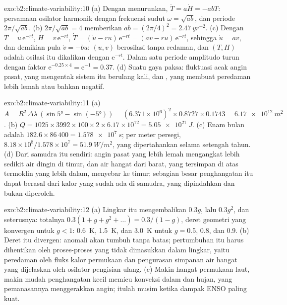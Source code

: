 \begin{solution}{exo:b2:climate-variability:10}
(a) Dengan menurunkan, $\ddot T = a\dot H = -abT$: persamaan osilator harmonik dengan frekuensi
sudut $\omega = \sqrt{ab}$, dan periode $2\pi/\sqrt{ab}$. (b) $2\pi/\sqrt{ab} = 4$ memberikan $ab =
(2\pi/4)^2 = \qty{2.47}{yr^{-2}}$. (c) Dengan $T = u\,\mathrm{e}^{-rt}$, $H = v\,\mathrm{e}^{-rt}$,
$\dot T = (\dot u - ru)\,\mathrm{e}^{-rt} = (av - ru)\,\mathrm{e}^{-rt}$, sehingga $\dot u = av$, dan
demikian pula $\dot v = -bu$: $(u, v)$ berosilasi tanpa redaman, dan $(T, H)$ adalah osilasi itu
dikalikan dengan $\mathrm{e}^{-rt}$. Dalam satu periode amplitudo turun dengan faktor $\mathrm{e}^{-0.25 \times
4} = \mathrm{e}^{-1} = 0.37$. (d) Suatu gaya paksa: fluktuasi acak angin pasat, yang
mengentak sistem itu berulang kali, dan , yang membuat peredaman lebih lemah atau
bahkan negatif.
\end{solution}

\begin{solution}{exo:b2:climate-variability:11}
(a) $A = R^2 \,\Delta\lambda\,(\sin\ang{5} - \sin(\ang{-5})) = (6.371 \times 10^6)^2 \times 0.8727
\times 0.1743 = \qty{6.17e12}{m^2}$. (b) $Q = 1025 \times 3992 \times 100 \times 2 \times 6.17
\times 10^{12} = \qty{5.05e21}{J}$. (c) Enam bulan adalah $182.6 \times 86\,400 = \qty{1.578e7}{s}$;
per meter persegi, $8.18 \times 10^8/1.578 \times 10^7 = \qty{51.9}{W/m^2}$, yang dipertahankan selama setengah
tahun. (d) Dari samudra itu sendiri: angin pasat yang lebih lemah mengangkat lebih sedikit air dingin di timur, dan air
hangat dari barat, yang tersimpan di atas termoklin yang lebih dalam, menyebar ke timur; sebagian besar penghangatan itu
dapat berasal dari kalor yang sudah ada di samudra, yang dipindahkan dan bukan diperoleh.
\end{solution}

\begin{solution}{exo:b2:climate-variability:12}
(a) Lingkar itu mengembalikan $0.3g$, lalu $0.3g^2$, dan seterusnya: totalnya $0.3(1 + g + g^2 + \dots) =
0.3/(1 - g)$, deret geometri yang konvergen untuk $g < 1$: \qty{0.6}{K}, \qty{1.5}{K}, dan
\qty{3.0}{K} untuk $g = 0.5$, 0.8, dan 0.9. (b) Deret itu divergen: anomali akan tumbuh tanpa
batas; pertumbuhan itu harus dihentikan oleh proses-proses yang tidak dimasukkan dalam lingkar, yaitu peredaman oleh fluks kalor
permukaan dan pengurasan simpanan air hangat yang dijelaskan oleh osilator pengisian ulang. (c)
Makin hangat permukaan laut, makin mudah penghangatan kecil memicu konveksi dalam dan hujan,
yang pemanasannya menggerakkan angin; itulah musim ketika dampak ENSO paling kuat.
\end{solution}

